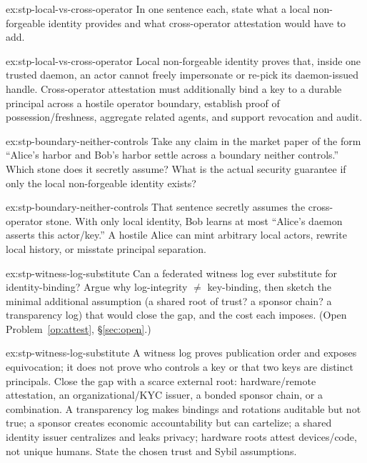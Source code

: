 \documentclass[11pt,a4paper]{article}
\theoremstyle{definition}
\begin{document}
\begin{pdexercise}[kind=Check,rating=1]{ex:stp-local-vs-cross-operator}
In one sentence each, state what a local non-forgeable identity provides and
what cross-operator attestation would have to add.
\end{pdexercise}
\begin{pdsolution}{ex:stp-local-vs-cross-operator}
Local non-forgeable identity proves that, inside one trusted daemon, an actor
cannot freely impersonate or re-pick its daemon-issued handle. Cross-operator
attestation must additionally bind a key to a durable principal across a
hostile operator boundary, establish proof of possession/freshness, aggregate
related agents, and support revocation and audit.
\end{pdsolution}
\begin{pdexercise}[kind=Trace,rating=2]{ex:stp-boundary-neither-controls}
Take any claim in the market paper of the form ``Alice's harbor and Bob's
harbor settle across a boundary neither controls.'' Which stone does it
secretly assume? What is the actual security guarantee if only the local
non-forgeable identity exists?
\end{pdexercise}
\begin{pdsolution}{ex:stp-boundary-neither-controls}
That sentence secretly assumes the cross-operator stone. With only local
identity, Bob learns at most ``Alice's daemon asserts this actor/key.'' A
hostile Alice can mint arbitrary local actors, rewrite local history, or
misstate principal separation.
\end{pdsolution}
\begin{pdexercise}[kind=Open,rating=3]{ex:stp-witness-log-substitute}
Can a federated witness log ever substitute for identity-binding? Argue why
log-integrity $\ne$ key-binding, then sketch the minimal additional assumption
(a shared root of trust? a sponsor chain? a transparency log) that would
close the gap, and the cost each imposes. (Open Problem~\ref{op:attest},
\S\ref{sec:open}.)
\end{pdexercise}
\begin{pdsolution}{ex:stp-witness-log-substitute}
A witness log proves publication order and exposes equivocation; it does not
prove who controls a key or that two keys are distinct principals. Close the
gap with a scarce external root: hardware/remote attestation, an
organizational/KYC issuer, a bonded sponsor chain, or a combination. A
transparency log makes bindings and rotations auditable but not true; a
sponsor creates economic accountability but can cartelize; a shared identity
issuer centralizes and leaks privacy; hardware roots attest devices/code, not
unique humans. State the chosen trust and Sybil assumptions.
\end{pdsolution}
\end{document}
